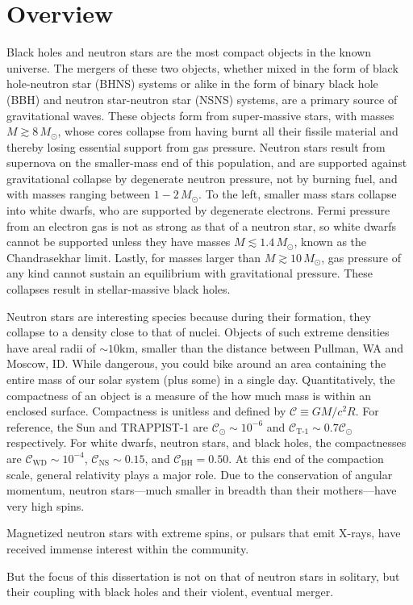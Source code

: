 \chapter{Overview}
\label{chap:chapter-1}


Black holes and neutron stars are the most compact objects in the known universe.  
The mergers of these two objects,
 whether mixed in the form of black hole-neutron star (BHNS) systems or alike in the form of binary black hole (BBH) and neutron star-neutron star (NSNS) systems,
 are a primary source of gravitational waves.  
These objects form from super-massive stars,
 with masses $M\gtrsim 8\,M_{\odot}$,
 whose cores collapse from having burnt all their fissile material and thereby
 losing essential support from gas pressure.
Neutron stars result from supernova on the smaller-mass end of this population,
 and are supported against gravitational collapse by degenerate neutron pressure,
 not by burning fuel,
 and with masses ranging between $1-2\,M_{\odot}$.
To the left,
 smaller mass stars collapse into white dwarfs,
 who are supported by degenerate electrons.  
Fermi pressure from an electron gas is not as strong as that of a neutron star,
 so white dwarfs cannot be supported unless they have masses $M\lesssim 1.4\,M_{\odot}$,
 known as the Chandrasekhar limit.  
Lastly, for masses larger than $M\gtrsim 10\,M_{\odot}$,
 gas pressure of any kind cannot sustain an equilibrium with gravitational pressure.  
These collapses result in stellar-massive black holes.

Neutron stars are interesting species because during their formation,
 they collapse to a density close to that of nuclei.
Objects of such extreme densities have areal radii of $\sim 10 \textrm{km}$,
 smaller than the distance between Pullman, WA and Moscow, ID.
While dangerous, you could bike around an area containing the entire mass of our solar system (plus some) in a single day. 
Quantitatively, the compactness of an object is a measure of the how much mass is within an enclosed surface.
Compactness is unitless and defined by $\mathcal{C}\equiv G M/c^2 R$.
For reference,
 the Sun and TRAPPIST-1 are
 $\mathcal{C}_{\odot} \sim 10^{-6}$
 and
 $\mathcal{C}_\textrm{T-1} \sim 0.7 \mathcal{C}_{\odot}$
 respectively.
For white dwarfs, neutron stars, and black holes, the compactnesses are 
 $\mathcal{C}_\textrm{WD} \sim 10^{-4}$,
 $\mathcal{C}_\textrm{NS} \sim 0.15$,
 and
 $\mathcal{C}_\textrm{BH} = 0.50$.
At this end of the compaction scale, general relativity plays a major role.
Due to the conservation of angular momentum, neutron stars---much smaller in breadth than their mothers---have very high spins.

Magnetized neutron stars with extreme spins, or pulsars that emit X-rays,
 have received immense interest within the community.

But the focus of this dissertation is not on that of neutron stars in solitary,
 but their coupling with black holes and their violent, eventual merger.

